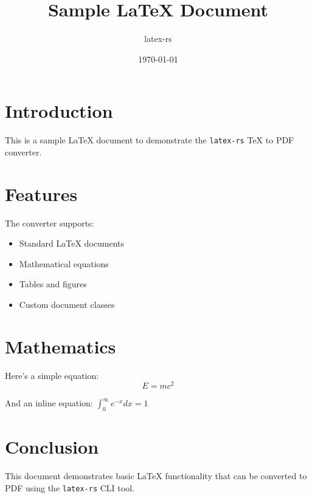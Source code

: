 \documentclass{article}
\title{Sample LaTeX Document}
\author{latex-rs}
\date{\today}
\begin{document}
\maketitle

\section{Introduction}

This is a sample LaTeX document to demonstrate the \texttt{latex-rs} TeX to PDF converter.

\section{Features}

The converter supports:
\begin{itemize}
    \item Standard LaTeX documents
    \item Mathematical equations
    \item Tables and figures
    \item Custom document classes
\end{itemize}

\section{Mathematics}

Here's a simple equation:
\begin{equation}
    E = mc^2
\end{equation}

And an inline equation: $\int_0^\infty e^{-x} dx = 1$

\section{Conclusion}

This document demonstrates basic LaTeX functionality that can be converted to PDF using the \texttt{latex-rs} CLI tool.
\end{document}

